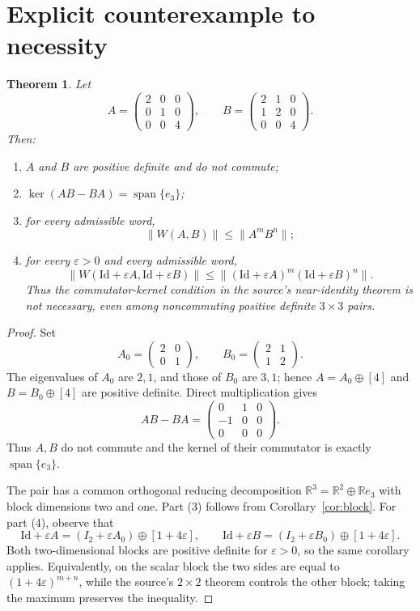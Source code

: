 \documentclass[11pt]{article}
\newtheorem{theorem}{Theorem}
\newcommand{\Id}{\mathrm{Id}}
\newcommand{\R}{\mathbb R}
\begin{document}
\section{Explicit counterexample to necessity}

\begin{theorem}\label{thm:example}
Let
\[
 A=\begin{pmatrix}2&0&0\\0&1&0\\0&0&4\end{pmatrix},\qquad
 B=\begin{pmatrix}2&1&0\\1&2&0\\0&0&4\end{pmatrix}.
\]
Then:
\begin{enumerate}
\item $A$ and $B$ are positive definite and do not commute;
\item $\ker(AB-BA)=\operatorname{span}\{e_3\}$;
\item for every admissible word,
\[
 \|W(A,B)\|\le \|A^mB^n\|;
\]
\item for every $\varepsilon>0$ and every admissible word,
\[
 \|W(\Id+\varepsilon A,\Id+\varepsilon B)\|
 \le
 \|(\Id+\varepsilon A)^m(\Id+\varepsilon B)^n\|.
\]
Thus the commutator-kernel condition in the source's near-identity theorem is
not necessary, even among noncommuting positive definite $3\times3$ pairs.
\end{enumerate}
\end{theorem}

\begin{proof}
Set
\[
 A_0=\begin{pmatrix}2&0\\0&1\end{pmatrix},\qquad
 B_0=\begin{pmatrix}2&1\\1&2\end{pmatrix}.
\]
The eigenvalues of $A_0$ are $2,1$, and those of $B_0$ are $3,1$; hence
$A=A_0\oplus[4]$ and $B=B_0\oplus[4]$ are positive definite.  Direct
multiplication gives
\[
 AB-BA=
 \begin{pmatrix}0&1&0\\-1&0&0\\0&0&0\end{pmatrix}.
\]
Thus $A,B$ do not commute and the kernel of their commutator is exactly
$\operatorname{span}\{e_3\}$.

The pair has a common orthogonal reducing decomposition $\R^3=\R^2\oplus
\R e_3$ with block dimensions two and one.  Part (3) follows from
Corollary~\ref{cor:block}.  For part (4), observe that
\[
 \Id+\varepsilon A=(I_2+\varepsilon A_0)\oplus[1+4\varepsilon],\qquad
 \Id+\varepsilon B=(I_2+\varepsilon B_0)\oplus[1+4\varepsilon].
\]
Both two-dimensional blocks are positive definite for $\varepsilon>0$, so
the same corollary applies.  Equivalently, on the scalar block the two sides
are equal to $(1+4\varepsilon)^{m+n}$, while the source's $2\times2$ theorem
controls the other block; taking the maximum preserves the inequality.
\end{proof}
\end{document}
